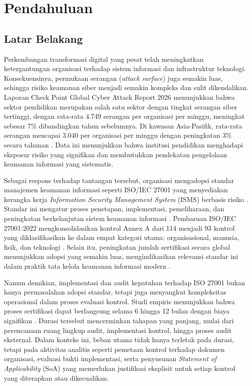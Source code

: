 

\chapter{Pendahuluan}

\section{Latar Belakang}
Perkembangan transformasi digital yang pesat telah meningkatkan ketergantungan organisasi terhadap sistem informasi dan infrastruktur teknologi. Konsekuensinya, permukaan serangan (\textit{attack surface}) juga semakin luas, sehingga risiko keamanan siber menjadi semakin kompleks dan sulit dikendalikan. Laporan Check Point Global Cyber Attack Report 2026 menunjukkan bahwa sektor pendidikan merupakan salah satu sektor dengan tingkat serangan siber tertinggi, dengan rata-rata 4.749 serangan per organisasi per minggu, meningkat sebesar 7\% dibandingkan tahun sebelumnya. Di kawasan Asia-Pasifik, rata-rata serangan mencapai 3.040 per organisasi per minggu dengan peningkatan 3\% secara tahunan \cite{checkpoint2026}. Data ini menunjukkan bahwa institusi pendidikan menghadapi eksposur risiko yang signifikan dan membutuhkan pendekatan pengelolaan keamanan informasi yang sistematis.

Sebagai respons terhadap tantangan tersebut, organisasi mengadopsi standar manajemen keamanan informasi seperti ISO/IEC 27001 yang menyediakan kerangka kerja \textit{Information Security Management System} (ISMS) berbasis risiko \cite{calder2023iso27001}. Standar ini mengatur proses penetapan, implementasi, pemeliharaan, dan peningkatan berkelanjutan sistem keamanan informasi \cite{isoiec20227001}. Pembaruan ISO/IEC 27001:2022 mengkonsolidasikan kontrol Annex A dari 114 menjadi 93 kontrol yang diklasifikasikan ke dalam empat kategori utama: organisasional, manusia, fisik, dan teknologi \cite{calder2023iso27001}. Selain itu, peningkatan jumlah sertifikasi secara global menunjukkan adopsi yang semakin luas, mengindikasikan relevansi standar ini dalam praktik tata kelola keamanan informasi modern \cite{marques2024automating}.

Namun demikian, implementasi dan audit kepatuhan terhadap ISO 27001 bukan hanya permasalahan adopsi standar, tetapi juga menyangkut kompleksitas operasional dalam proses evaluasi kontrol. Studi empiris menunjukkan bahwa proses sertifikasi dapat berlangsung selama 6 hingga 12 bulan dengan biaya signifikan \cite{marques2024automating}. Durasi tersebut mencerminkan tahapan yang panjang, mulai dari perencanaan ruang lingkup audit, implementasi kontrol, hingga proses audit eksternal. Dalam konteks ini, beban utama tidak hanya terletak pada durasi, tetapi pada aktivitas analitis seperti pemetaan kontrol terhadap dokumen organisasi, evaluasi bukti implementasi, serta penyusunan \textit{Statement of Applicability} (SoA) yang memerlukan justifikasi eksplisit untuk setiap kontrol yang diterapkan atau dikecualikan.

